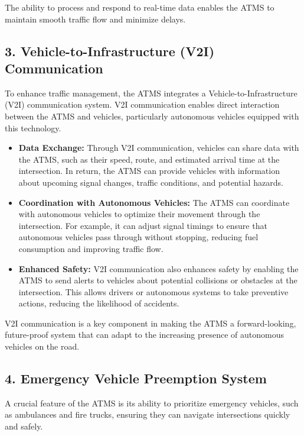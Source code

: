 \documentclass{scrreprt}
\begin{document}
The ability to process and respond to real-time data enables the ATMS to maintain smooth traffic flow and minimize delays.

\subsection*{3. Vehicle-to-Infrastructure (V2I) Communication}

To enhance traffic management, the ATMS integrates a Vehicle-to-Infrastructure (V2I) communication system. V2I communication enables direct interaction between the ATMS and vehicles, particularly autonomous vehicles equipped with this technology.

\begin{itemize}
    \item \textbf{Data Exchange:} 
    Through V2I communication, vehicles can share data with the ATMS, such as their speed, route, and estimated arrival time at the intersection. In return, the ATMS can provide vehicles with information about upcoming signal changes, traffic conditions, and potential hazards.

    \item \textbf{Coordination with Autonomous Vehicles:} 
    The ATMS can coordinate with autonomous vehicles to optimize their movement through the intersection. For example, it can adjust signal timings to ensure that autonomous vehicles pass through without stopping, reducing fuel consumption and improving traffic flow.

    \item \textbf{Enhanced Safety:} 
    V2I communication also enhances safety by enabling the ATMS to send alerts to vehicles about potential collisions or obstacles at the intersection. This allows drivers or autonomous systems to take preventive actions, reducing the likelihood of accidents.
\end{itemize}

V2I communication is a key component in making the ATMS a forward-looking, future-proof system that can adapt to the increasing presence of autonomous vehicles on the road.

\subsection*{4. Emergency Vehicle Preemption System}

A crucial feature of the ATMS is its ability to prioritize emergency vehicles, such as ambulances and fire trucks, ensuring they can navigate intersections quickly and safely.
\end{document}
